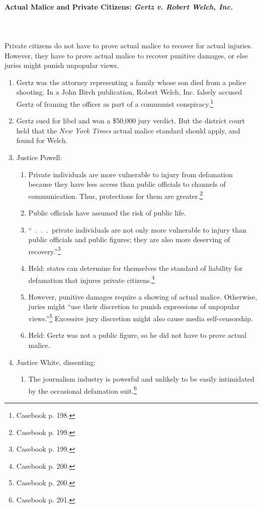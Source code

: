 \paragraph{Actual Malice and Private Citizens: \emph{Gertz v. Robert Welch, 
Inc.}}
~\\\\
Private citizens do not have to prove actual malice to recover for actual 
injuries. However, they have to prove actual malice to recover punitive damages, 
or else juries might punish unpopular views.

\begin{enumerate}
    \item Gertz was the attorney representing a family whose son died from a 
    police shooting. In a John Birch publication, Robert Welch, Inc. falsely 
    accused Gertz of framing the officer as part of a communist 
    conspiracy.\footnote{Casebook p. 198.}
    \item Gertz sued for libel and won a \$50,000 jury verdict. But the district 
    court held that the \emph{New York Times} actual malice standard should 
    apply, and found for Welch.
    \item Justice Powell:
    \begin{enumerate}
        \item Private individuals are more vulnerable to injury from defamation 
        because they have less access than public officials to channels of 
        communication. Thus, protections for them are greater.\footnote{Casebook 
        p. 199.}
        \item Public officials have assumed the risk of public life.
        \item ``~.~.~.~private individuals are not only more vulnerable to 
        injury than public officials and public figures; they are also more 
        deserving of recovery.''\footnote{Casebook p. 199.}
        \item Held: states can determine for themselves the standard of 
        liability for defamation that injures private 
        citizens.\footnote{Casebook p. 200.}
        \item However, punitive damages require a showing of actual malice. 
        Otherwise, juries might ``use their discretion to punish expressions of 
        unpopular views.''\footnote{Casebook p. 200.} Excessive jury discretion 
        might also cause media self-censorship.
        \item Held: Gertz was not a public figure, so he did not have to prove 
        actual malice.
    \end{enumerate}
    \item Justice White, dissenting:
    \begin{enumerate}
        \item The journalism industry is powerful and unlikely to be easily 
        intimidated by the occasional defamation suit.\footnote{Casebook p. 
        201.}
    \end{enumerate}
\end{enumerate}

